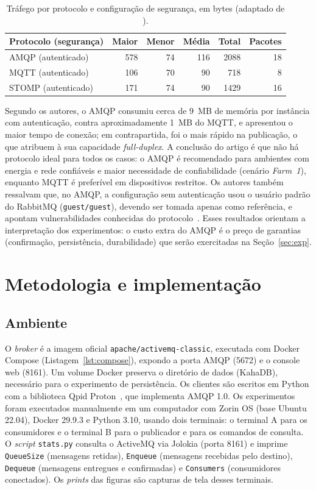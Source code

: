 \documentclass[12pt,a4paper]{article}
\begin{document}
\begin{table}[H]\centering
\caption{Tráfego por protocolo e configuração de segurança, em bytes (adaptado de \cite{bezerra2024}).}\label{tab:paper}
\begin{tabular}{lrrrrr}\toprule
Protocolo (segurança) & Maior & Menor & Média & Total & Pacotes\\\midrule
AMQP (autenticado) & 578 & 74 & 116 & 2088 & 18\\
MQTT (autenticado) & 106 & 70 & 90 & 718 & 8\\
STOMP (autenticado) & 171 & 74 & 90 & 1429 & 16\\\bottomrule
\end{tabular}\end{table}

Segundo os autores, o AMQP consumiu cerca de 9~MB de memória por instância com autenticação, contra aproximadamente 1~MB do MQTT, e apresentou o maior tempo de conexão; em contrapartida, foi o mais rápido na publicação, o que atribuem à sua capacidade \textit{full-duplex}. A conclusão do artigo é que não há protocolo ideal para todos os casos: o AMQP é recomendado para ambientes com energia e rede confiáveis e maior necessidade de confiabilidade (cenário \textit{Farm~1}), enquanto MQTT é preferível em dispositivos restritos. Os autores também ressalvam que, no AMQP, a configuração sem autenticação usou o usuário padrão do RabbitMQ (\texttt{guest/guest}), devendo ser tomada apenas como referência, e apontam vulnerabilidades conhecidas do protocolo~\cite{mcateer2017}. Esses resultados orientam a interpretação dos experimentos: o custo extra do AMQP é o preço de garantias (confirmação, persistência, durabilidade) que serão exercitadas na Seção~\ref{sec:exp}.

\section{Metodologia e implementação}
\subsection{Ambiente}
O \textit{broker} é a imagem oficial \texttt{apache/activemq-classic}, executada com Docker Compose (Listagem~\ref{lst:compose}), expondo a porta AMQP (5672) e o console web (8161). Um volume Docker preserva o diretório de dados (KahaDB), necessário para o experimento de persistência. Os clientes são escritos em Python com a biblioteca Qpid Proton~\cite{proton}, que implementa AMQP 1.0. Os experimentos foram executados manualmente em um computador com Zorin OS (base Ubuntu 22.04), Docker 29.9.3 e Python 3.10, usando dois terminais: o terminal A para os consumidores e o terminal B para o publicador e para os comandos de consulta. O \textit{script} \texttt{stats.py} consulta o ActiveMQ via Jolokia (porta 8161) e imprime \texttt{QueueSize} (mensagens retidas), \texttt{Enqueue} (mensagens recebidas pelo destino), \texttt{Dequeue} (mensagens entregues e confirmadas) e \texttt{Consumers} (consumidores conectados). Os \textit{prints} das figuras são capturas de tela desses terminais.
\end{document}
